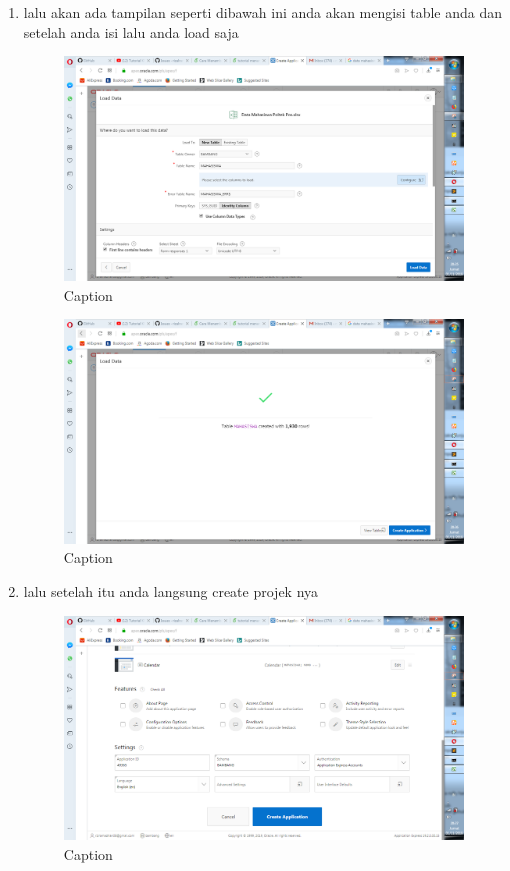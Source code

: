 \documentclass{article}
\begin{document}
\begin{enumerate}
\item lalu akan ada tampilan seperti dibawah ini anda akan mengisi table anda dan setelah anda isi lalu anda load saja

\begin{figure}[!htbp]
    \centering
    \includegraphics[scale=0.4]{gambar/Capture6.PNG}
    \caption{Caption}
    \label{fig:my_label}
\end{figure}

\begin{figure}[!htbp]
    \centering
    \includegraphics[scale=0.4]{gambar/Capture7.PNG}
    \caption{Caption}
    \label{fig:my_label}
\end{figure}

\item lalu setelah itu anda langsung create projek nya

\begin{figure}[!htbp]
    \centering
    \includegraphics[scale=0.4]{gambar/Capture8.PNG}
    \caption{Caption}
    \label{fig:my_label}
\end{figure}


\end{enumerate}
\end{document}
